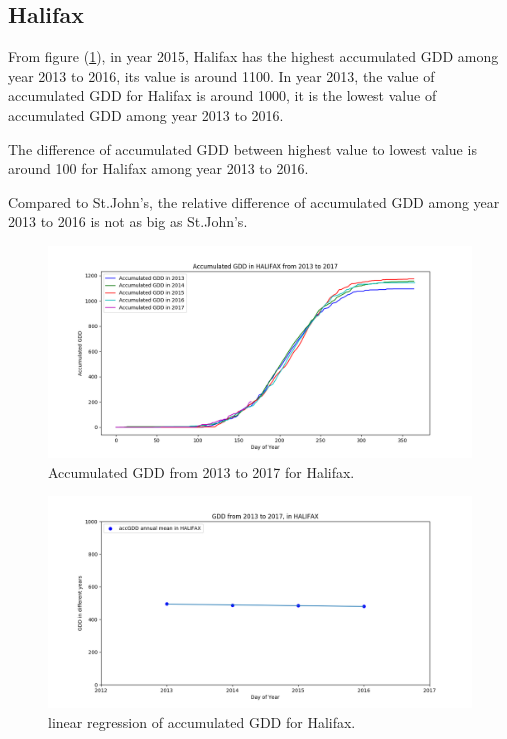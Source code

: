 \documentclass[12pt]{article}
\begin{document}
\subsection{Halifax}

From figure (\ref{11}), in year 2015, Halifax has the highest accumulated GDD among year 2013 to 2016, its value is around 1100. In year 2013, the value of accumulated GDD for Halifax is around 1000, it is the lowest value of accumulated GDD among year 2013 to 2016. 

The difference of accumulated GDD between highest value to lowest value is around 100 for Halifax among year 2013 to 2016.

Compared to St.John's, the relative difference of accumulated GDD among year 2013 to 2016 is not as big as St.John's.
\begin{center}
\begin{figure}[H]
\includegraphics[width=5.25in]{../Plot/HALIFAX/accGDD_2013_2017.png}
\caption{Accumulated GDD from 2013 to 2017 for Halifax.}
\label{11}
\end{figure}
\end{center}

\begin{center}
\begin{figure}[H]
\includegraphics[width=5.25in]{../Plot/HALIFAX/GDD_LinearRegression_HALIFAX.png}

\caption{linear regression of accumulated GDD for  Halifax.}
\label{12}
\end{figure}
\end{center}
\end{document}
